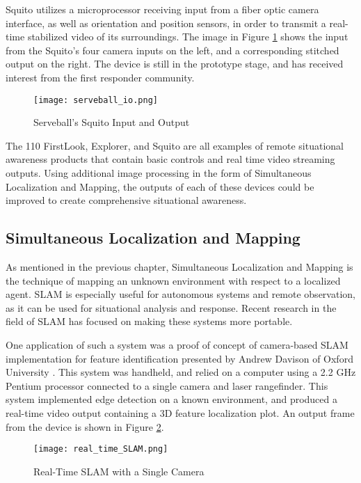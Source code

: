 Squito utilizes a microprocessor receiving input from a fiber optic camera interface, as well as orientation and position sensors, in order to transmit a real-time stabilized video of its surroundings. The image in Figure \ref{squito_io} shows the input from the Squito's four camera inputs on the left, and a corresponding stitched output on the right. The device is still in the prototype stage, and has received interest from the first responder community. 
\par
\begin{figure}[H]
	\centerline{\texttt{[image: serveball\_io.png]}}
	\caption{Serveball's Squito Input and Output \cite{serveball}}
	\label{squito_io}
\end{figure}
\par
The 110 FirstLook, Explorer, and Squito are all examples of remote situational awareness products that contain basic controls and real time video streaming outputs. Using additional image processing in the form of Simultaneous Localization and Mapping, the outputs of each of these devices could be improved to create comprehensive situational awareness. 

\subsection{Simultaneous Localization and Mapping}
As mentioned in the previous chapter, Simultaneous Localization and Mapping is the technique of mapping an unknown environment with respect to a localized agent. SLAM is especially useful for autonomous systems and remote observation, as it can be used for situational analysis and response. Recent research in the field of SLAM has focused on making these systems more portable.
\par
One application of such a system was a proof of concept of camera-based SLAM implementation for feature identification presented by Andrew Davison of Oxford University \cite{davison}. This system was handheld, and relied on a computer using a 2.2 GHz Pentium processor connected to a single camera and laser rangefinder. This system implemented edge detection on a known environment, and produced a real-time video output containing a 3D feature localization plot. An output frame from the device is shown in Figure \ref{rtSLAM}.

\begin{figure}[H]
	\centerline{\texttt{[image: real\_time\_SLAM.png]}}
	\caption{Real-Time SLAM with a Single Camera \cite{davison}}
	\label{rtSLAM}
\end{figure}

